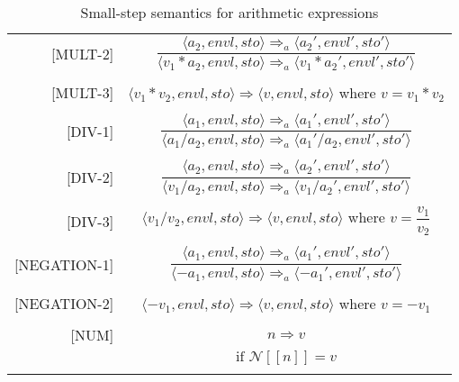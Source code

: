 \begin{longtable}[c] { r c }
  [MULT-2] & 
    \( \dfrac { \langle a_2, envl, sto \rangle \Rightarrow_a \langle a_2', envl', sto' \rangle }
      {\langle v_1 * a_2, envl, sto \rangle \Rightarrow_a \langle v_1 * a_2', envl', sto' \rangle } \) \\
  & \\

  [MULT-3] & 
    \( \langle v_1 * v_2, envl, sto \rangle \Rightarrow \langle v, envl, sto \rangle \) where \( v = v_1 * v_2\) \\
  & \\

  [DIV-1] & 
    \( \dfrac { \langle a_1, envl, sto \rangle \Rightarrow_a \langle a_1', envl', sto' \rangle }
      {\langle a_1 / a_2, envl, sto \rangle \Rightarrow_a \langle a_1' / a_2, envl', sto' \rangle } \) \\
  & \\

  [DIV-2] & 
    \( \dfrac { \langle a_2, envl, sto \rangle \Rightarrow_a \langle a_2', envl', sto' \rangle }
      {\langle v_1 / a_2, envl, sto \rangle \Rightarrow_a \langle v_1 / a_2', envl', sto' \rangle } \) \\
  & \\

  [DIV-3] & 
    \( \langle v_1 / v_2, envl, sto \rangle \Rightarrow \langle v, envl, sto \rangle \) where \( v = \dfrac{ v_1 }{ v_2 } \) \\
  & \\

  [NEGATION-1] & 
    \( \dfrac { \langle a_1, envl, sto \rangle \Rightarrow_a \langle a_1', envl', sto' \rangle }
      {\langle -a_1, envl, sto \rangle \Rightarrow_a \langle -a_1', envl', sto' \rangle } \) \\
  & \\

  [NEGATION-2] & 
    \( \langle -v_1, envl, sto \rangle \Rightarrow \langle v, envl, sto \rangle \) where \( v = -v_1 \)\\
  & \\

  [NUM] & 
    \( n \Rightarrow v \) \\
  & \( \text{if } \mathcal{N} [[n]] = v \) \\

  \caption{Small-step semantics for arithmetic expressions}
\end{longtable}

